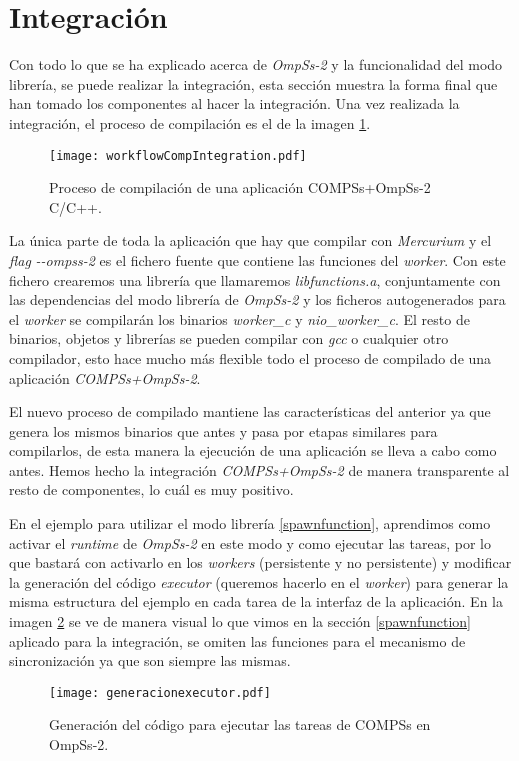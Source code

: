\section{Integración}

Con todo lo que se ha explicado acerca de \textit{OmpSs-2} y la funcionalidad del modo librería, se puede realizar la integración, esta sección muestra la forma final que han tomado los componentes al hacer la integración. Una vez realizada la integración, el proceso de compilación es el de la imagen \ref{fig:workflowcompintegration}.

\begin{figure}[h]
	\centering 
	\caption{Proceso de compilación de una aplicación COMPSs+OmpSs-2 C/C++.}
	\texttt{[image: workflowCompIntegration.pdf]}
	\label{fig:workflowcompintegration}
\end{figure}

\par\bigskip

La única parte de toda la aplicación que hay que compilar con \textit{Mercurium} y el \textit{flag} \textit{-{}-ompss-2} es el fichero fuente que contiene las funciones del \textit{worker}. Con este fichero crearemos una librería que llamaremos \textit{libfunctions.a}, conjuntamente con las dependencias del modo librería de \textit{OmpSs-2} y los ficheros autogenerados para el \textit{worker} se compilarán los binarios \textit{worker\_c} y \textit{nio\_worker\_c}. El resto de binarios, objetos y librerías se pueden compilar con \textit{gcc} o cualquier otro compilador, esto hace mucho más flexible todo el proceso de compilado de una aplicación \textit{COMPSs+OmpSs-2}.
\par\bigskip
El nuevo proceso de compilado mantiene las características del anterior ya que genera los mismos binarios que antes y pasa por etapas similares para compilarlos, de esta manera la ejecución de una aplicación se lleva a cabo como antes. Hemos hecho la integración \textit{COMPSs+OmpSs-2} de manera transparente al resto de componentes, lo cuál es muy positivo.
\par\bigskip 

En el ejemplo para utilizar el modo librería \ref{spawnfunction}, aprendimos como activar el \textit{runtime} de \textit{OmpSs-2} en este modo y como ejecutar las tareas, por lo que bastará con activarlo en los \textit{workers} (persistente y no persistente) y modificar la generación del código \textit{executor} (queremos hacerlo en el \textit{worker}) para generar la misma estructura del ejemplo en cada tarea de la interfaz de la aplicación. En la imagen \ref{fig:genexecutorOmpSs2} se ve de manera visual lo que vimos en la sección \ref{spawnfunction} aplicado para la integración, se omiten las funciones para el mecanismo de sincronización ya que son siempre las mismas.
\bigskip
\begin{figure}[h]
	\centering 
	\caption{Generación del código para ejecutar las tareas de COMPSs en OmpSs-2.}
	\texttt{[image: generacionexecutor.pdf]}
	\label{fig:genexecutorOmpSs2}
\end{figure}
\bigskip

